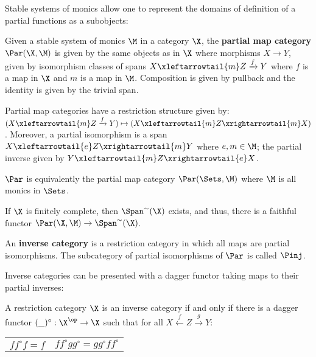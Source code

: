 Stable systems of monics allow one to represent the domains of definition of a partial functions as a subobjects:

\begin{definition}\cite[\S 3.1]{cockett}
Given a stable system of monics $\M$ in a category $\X$, the {\bf partial map category} $\Par(\X,\M)$ is given by the same objects as in $\X$ where morphisms $X\to Y$, given by isomorphism classes of spans $X\xleftarrowtail{m} Z \xrightarrow{f} Y$ where $f$ is a map in $\X$ and $m$ is a map in $\M$.  Composition is given by pullback and the identity is given by the trivial span.


Partial map categories have a restriction structure given by:  $(X\xleftarrowtail{m} Z \xrightarrow{f} Y) \mapsto (X\xleftarrowtail{m} Z \xrightarrowtail{m} X)$.  Moreover, a partial isomorphism is a span $X\xleftarrowtail{e} Z \xrightarrowtail{m} Y$ where $e,m \in \M$; the partial inverse given by  $Y\xleftarrowtail{m} Z \xrightarrowtail{e} X$.
\end{definition}


$\Par$ is equivalently the partial map category $\Par(\Sets,\M)$ where $\M$ is all monics in $\Sets$.









If  $\X$ is finitely complete, then $\Span^\sim(\X)$ exists, and thus, there is a faithful functor $\Par(\X,\M)\to \Span^\sim(\X)$.


\begin{definition}\cite[\S 2.3.2]{cockett}
An {\bf inverse category} is a restriction category in which all maps are partial isomorphisms.  The subcategory of partial isomorphisms of $\Par$ is called $\Pinj$.
\end{definition}

Inverse categories can be presented with a dagger functor taking maps to their partial inverses:

\begin{theorem}\cite[Thm. 2.20]{cockett}
A restriction category $\X$ is an inverse category if and only if there is a dagger functor $(\_)^\circ:\X^\op\to\X$ such that for all $X\xleftarrow{f} Z \xrightarrow{g} Y$:
\begin{center}
\begin{tabular}{cc}
 $f f^\circ f = f$ & 
 $f f ^\circ gg^\circ = gg^\circ f f ^\circ $
\end{tabular}
\end{center}
\end{theorem}

